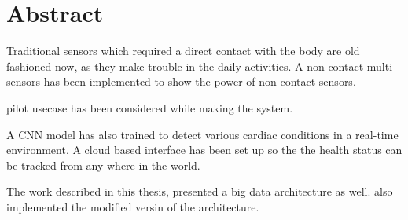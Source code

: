 \chapter{Abstract}

Traditional sensors which required a direct contact with the body are old fashioned now, as they make trouble in the daily activities. A non-contact multi-sensors has been implemented to show the power of non contact sensors. 

pilot usecase has been considered while making the system.

A CNN model has also trained to detect various cardiac conditions in a real-time environment. A cloud based interface has been set up so the the health status can be tracked from any where in the world. 

The work described in this thesis, presented a big data architecture as well. also implemented the modified versin of the architecture.

\cleardoubleemptypage
\thispagestyle{empty}